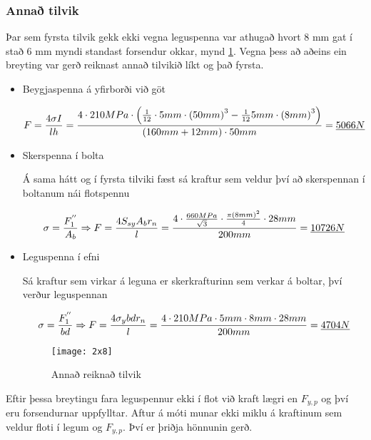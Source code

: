 \subsubsection{Annað tilvik}

Þar sem fyrsta tilvik gekk ekki vegna leguspenna var athugað hvort 8 mm gat í stað 6 mm myndi standast forsendur okkar, \sbr mynd \ref{fig::2x8}. Vegna þess að aðeins ein breyting var gerð reiknast annað tilvikið líkt og það fyrsta.

\begin{itemize}
\item Beygjaspenna á yfirborði við göt
  
  \[
  F = {4 \sigma I \over l h} 
  = {
    4 \cdot 210 MPa \cdot 
    \left(
      {1 \over 12} 
      \cdot 5 mm \cdot 
      \left(
        50mm
      \right)^3 
      - 
      {1 \over 12} 5 mm \cdot 
      \left(
        8mm
      \right)^3
    \right) 
    \over 
    (160 mm + 12 mm) \cdot 50 mm
  } 
  = \underline{5066N}
  \] 
  
\item Skerspenna í bolta
  
  Á sama hátt og í fyrsta tilviki fæst sá kraftur sem veldur því að skerspennan í boltanum nái flotspennu
  
  \[
  \sigma = {F_1^{''} \over A_b} 
  \Rightarrow 
  F = {4 S_{sy} A_b r_n \over l} 
  = {4 \cdot {660MPa \over \sqrt{3}} 
    \cdot 
    {
      \pi 
      \left(
        8mm
      \right)^2 
      \over 
      4
    } 
    \cdot 28 mm \over 200 mm
  } 
  = \underline{10726N}
  \]
  
\item Leguspenna í efni
  
  Sá kraftur sem virkar á leguna er skerkrafturinn sem verkar á boltar, því verður leguspennan
  
  \[
  \sigma = {F_1^{''} \over bd} 
  \Rightarrow 
  F = {4 \sigma_{y} b d r_n \over l} 
  = {
    4 \cdot 210 MPa \cdot 5 mm \cdot 8 mm \cdot 28 mm 
    \over 
    200mm
  } 
  = \underline{4704N}
  \]

  \begin{figure}
    \centering
    \texttt{[image: 2x8]}
    \caption{Annað reiknað tilvik}
    \label{fig::2x8}
  \end{figure}

\end{itemize}

Eftir þessa breytingu fara leguspennur ekki í flot við kraft lægri en $F_{y,p}$ og því eru forsendurnar uppfylltar. 
Aftur á móti munar ekki miklu á kraftinum sem veldur floti í legum og $F_{y,p}$. Því er þriðja hönnunin gerð.


